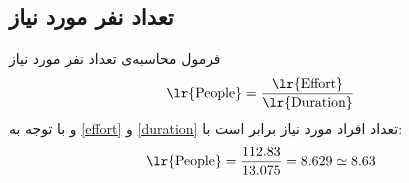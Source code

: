 \subsection{تعداد نفر مورد نیاز}
فرمول محاسبه‌ی تعداد نفر مورد نیاز
\begin{equation*}
\text{\lr{People}} = \frac{\text{\lr{Effort}}}{\text{\lr{Duration}}}
\end{equation*}
و با توجه به 
\ref{effort} و
\ref{duration}
تعداد افراد مورد نیاز برابر است با:
\begin{equation}
\text{\lr{People}} = \frac{112.83}{13.075} = 8.629 \simeq 8.63
\end{equation}